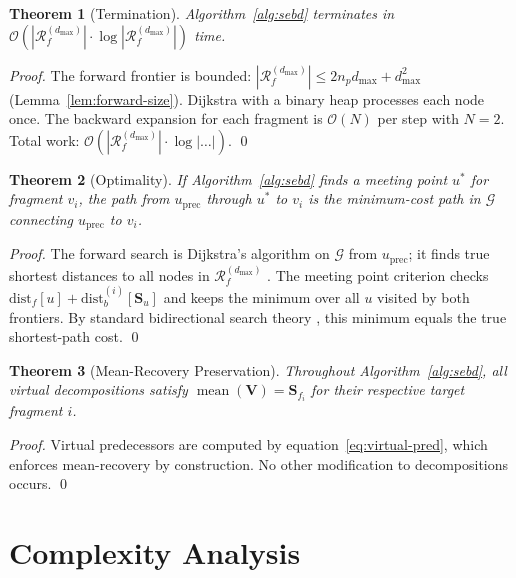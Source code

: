\documentclass[twocolumn,10pt,a4paper]{article}
\theoremstyle{thmstyle}
\newtheorem{theorem}{Theorem}[section]
\theoremstyle{definition}
\theoremstyle{remark}
\newcommand{\Sv}{\mathbf{S}}
\newcommand{\calG}{\mathcal{G}}
\newcommand{\Reachf}{\mathcal{R}_f}
\DeclareMathOperator{\mean}{mean}
\begin{document}
\begin{theorem}[Termination]
\label{thm:termination}
Algorithm~\ref{alg:sebd} terminates in $\mathcal{O}(|\Reachf^{(d_\text{max})}| \cdot \log |\Reachf^{(d_\text{max})}|)$ time.
\end{theorem}

\begin{proof}
The forward frontier is bounded: $|\Reachf^{(d_\text{max})}| \leq
2n_p d_\text{max} + d_\text{max}^2$ (Lemma~\ref{lem:forward-size}).
Dijkstra with a binary heap processes each node once. The backward
expansion for each fragment is $\mathcal{O}(N)$ per step with $N = 2$.
Total work: $\mathcal{O}(|\Reachf^{(d_\text{max})}| \cdot \log|\ldots|)$.
\qed
\end{proof}

\begin{theorem}[Optimality]
\label{thm:optimality}
If Algorithm~\ref{alg:sebd} finds a meeting point $u^*$ for fragment
$v_i$, the path from $u_\text{prec}$ through $u^*$ to $v_i$ is the
minimum-cost path in $\calG$ connecting $u_\text{prec}$ to $v_i$.
\end{theorem}

\begin{proof}
The forward search is Dijkstra's algorithm on $\calG$ from
$u_\text{prec}$; it finds true shortest distances to all nodes in
$\Reachf^{(d_\text{max})}$ \citep{dijkstra1959}. The meeting point
criterion checks $\text{dist}_f[u] + \text{dist}_b^{(i)}[\Sv_u]$
and keeps the minimum over all $u$ visited by both frontiers.
By standard bidirectional search theory \citep{pohl1969,kaindl1997},
this minimum equals the true shortest-path cost. \qed
\end{proof}

\begin{theorem}[Mean-Recovery Preservation]
\label{thm:mean-recovery}
Throughout Algorithm~\ref{alg:sebd}, all virtual decompositions satisfy
$\mean(\mathbf{V}) = \Sv_{f_i}$ for their respective target fragment $i$.
\end{theorem}

\begin{proof}
Virtual predecessors are computed by equation~\eqref{eq:virtual-pred},
which enforces mean-recovery by construction. No other modification
to decompositions occurs. \qed
\end{proof}

\section{Complexity Analysis}
\label{sec:complexity}
\end{document}
